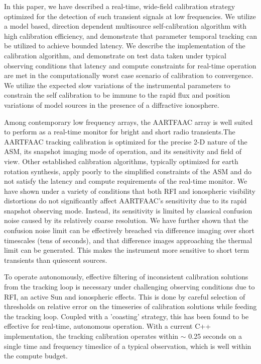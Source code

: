 \documentclass{aa}
\begin{document}
In this  paper, we have  described a real-time, wide-field  calibration strategy
optimized for  the detection of such  transient signals at  low frequencies.  We
utilize  a   model  based,  direction   dependent  multisource  self-calibration
algorithm  with  high calibration  efficiency,  and  demonstrate that  parameter
temporal tracking can  be utilized to achieve bounded  latency.  We describe the
implementation of the calibration algorithm,  and demonstrate on test data taken
under  typical observing  conditions that  latency and  compute  constraints for
real-time  operation are  met  in  the computationally  worst  case scenario  of
calibration  to convergence.   We utilize  the expected  slow variations  of the
instrumental parameters  to constrain the self  calibration to be  immune to the
rapid  flux and  position  variations of  model  sources in  the  presence of  a
diffractive ionosphere.

Among  contemporary low  frequency  arrays, the  \mbox{AARTFAAC}  array is  well
suited  to  perform   as  a  real-time  monitor  for   bright  and  short  radio
transients.The \mbox{AARTFAAC} tracking calibration is optimized for the precise
2-D  nature  of  the ASM,  its  snapshot  imaging  mode  of operation,  and  its
sensitivity  and  field  of  view.  Other  established  calibration  algorithms,
typically optimized for earth rotation synthesis, apply poorly to the simplified
constraints of the  ASM and do not satisfy the  latency and compute requirements
of the real-time monitor.  We have shown under a variety of conditions that both
RFI  and   ionospheric  visibility  distortions  do   not  significantly  affect
\mbox{AARTFAAC's}  sensitivity  due  to   its  rapid  snapshot  observing  mode.
Instead, its sensitivity  is limited by classical confusion  noise caused by its
relatively coarse  resolution.  We have  further shown that the  confusion noise
limit can be  effectively breached via difference imaging  over short timescales
(tens of seconds), and that  difference images approaching the thermal limit can
be generated. This makes the  instrument more sensitive to short term transients
than quiescent sources.

To  operate  autonomously,   effective  filtering  of  inconsistent  calibration
solutions  from  the tracking  loop  is  necessary  under challenging  observing
conditions due to  RFI, an active Sun and ionospheric effects.   This is done by
careful  selection  of  thresholds  on  relative  error  on  the  timeseries  of
calibration solutions while feeding the tracking loop. Coupled with a 'coasting'
strategy,  this  has  been  found  to be  effective  for  real-time,  autonomous
operation. With a current  C++ implementation, the tracking calibration operates
within $\sim$ 0.25 seconds on a single time and frequency timeslice of a typical
observation, which is well within the compute budget.
\end{document}
